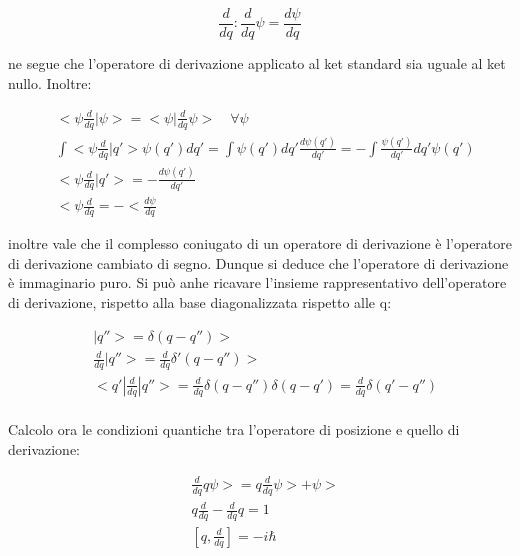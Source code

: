\documentclass{article}
\begin{document}
\begin{equation}
    \frac{d}{dq} : \frac{d}{dq} \psi = \frac{d \psi}{dq}
\end{equation}

ne segue che l'operatore di derivazione applicato al ket standard sia uguale al ket nullo.
Inoltre:

\begin{equation}
    \begin{aligned}
         & <\psi \frac{d}{dq} | \psi>= <\psi |\frac{d}{dq} \psi> \quad \forall \psi                                                  \\
         & \int <\psi \frac{d}{dq} | q'> \psi(q')dq'= \int \psi(q') dq' \frac{d\psi(q')}{dq'}=-\int \frac{\psi(q')}{dq'}dq' \psi(q') \\
         & <\psi \frac{d}{dq}|q'>=-\frac{d\psi(q')}{dq'}                                                                             \\
         & <\psi \frac{d}{dq} = -<\frac{d\psi}{dq}
    \end{aligned}
\end{equation}

inoltre vale che il complesso coniugato di un operatore di derivazione è l'operatore di derivazione cambiato di segno.
Dunque si deduce che l'operatore di derivazione è immaginario puro.
Si può anhe ricavare l'insieme rappresentativo dell'operatore di derivazione, rispetto alla base diagonalizzata rispetto alle q:

\begin{equation}
    \begin{aligned}
         & |q''>= \delta(q-q'')>                                                                     \\
         & \frac{d}{dq}|q''>= \frac{d}{dq}\delta'(q-q'')>                                            \\
         & <q'|\frac{d}{dq}|q''>= \frac{d}{dq}\delta(q-q'')\delta(q-q')= \frac{d}{dq} \delta(q'-q'') \\
    \end{aligned}
\end{equation}

Calcolo ora le condizioni quantiche tra l'operatore di posizione e quello di derivazione:

\begin{equation}
    \begin{aligned}
         & \frac{d}{dq} q\psi>= q\frac{d}{dq}\psi> + \psi> \\
         & q\frac{d}{dq}-\frac{d}{dq}q=1                   \\
         & [q,\frac{d}{dq}]=-i\hbar
    \end{aligned}
\end{equation}
\end{document}

